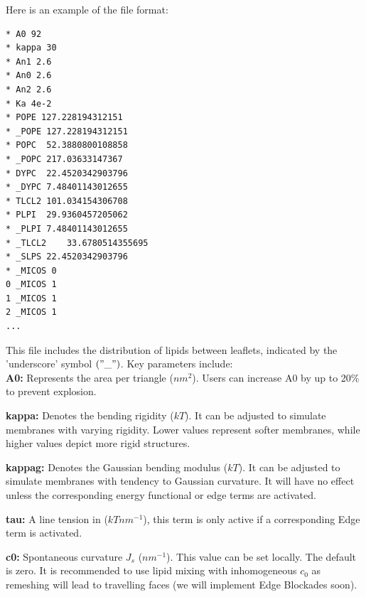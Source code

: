 \documentclass[11pt]{article}
\begin{document}
\noindent
Here is an example of the file format:
\begin{mdframed}[backgroundcolor=lightgray, linecolor=lightgray]  %
\begin{verbatim}
* A0 92
* kappa 30
* An1 2.6
* An0 2.6
* An2 2.6
* Ka 4e-2
* POPE 127.228194312151
* _POPE	127.228194312151
* POPC	52.3880800108858
* _POPC 217.03633147367
* DYPC	22.4520342903796
* _DYPC	7.48401143012655
* TLCL2	101.034154306708
* PLPI	29.9360457205062
* _PLPI	7.48401143012655
* _TLCL2	33.6780514355695
* _SLPS 22.4520342903796
* _MICOS 0
0 _MICOS 1
1 _MICOS 1
2 _MICOS 1
...
\end{verbatim}
\end{mdframed}
\noindent
This file includes the distribution of lipids between leaflets, indicated by the 'underscore' symbol $("\_")$. Key parameters include:\\
\noindent
\textbf{A0:} Represents the area per triangle ($nm^2$). Users can increase A0 by up to 20\% to prevent explosion.

\noindent
\textbf{kappa:} Denotes the bending rigidity ($kT$). It can be adjusted to simulate membranes with varying rigidity. Lower values represent softer membranes, while higher values depict more rigid structures.

\noindent
\textbf{kappag:} Denotes the Gaussian bending modulus ($kT$). It can be adjusted to simulate membranes with tendency to Gaussian curvature. It will have no effect unless the corresponding energy functional or edge terms are activated.

\noindent
\textbf{tau:} A line tension in ($kT nm^{-1}$), this term is only active if a corresponding Edge term is activated.

\noindent
\textbf{c0:} Spontaneous curvature $J_s$ ($nm^{-1}$). This value can be set locally. The default is zero. It is recommended to use lipid mixing with inhomogeneous $c_0$ as remeshing will lead to travelling faces (we will implement Edge Blockades soon).
\end{document}
